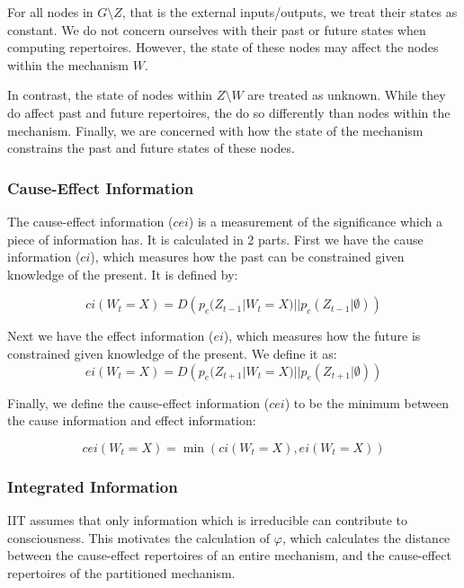 For all nodes in $G\setminus Z$, that is the external inputs/outputs, we treat their states as constant. We do not concern ourselves with their past or future states when computing repertoires. However, the state of these nodes may affect the nodes within the mechanism $W$.

In contrast, the state of nodes within $Z \setminus W$ are treated as unknown. While they do affect past and future repertoires, the do so differently than nodes within the mechanism. Finally, we are concerned with how the state of the mechanism constrains the past and future states of these nodes.

\subsubsection{Cause-Effect Information}
The cause-effect information ($cei$) is a measurement of the significance which a piece of information has. It is calculated in 2 parts. First we have the cause information ($ci$), which measures how the past can be constrained given knowledge of the present. It is defined by:

\begin{equation}
\label{def:ci}
ci(W_{t} = X) = D\left(p_c(Z_{t-1}|W_{t} = X)||p_c(Z_{t-1}|\emptyset)\right)
\end{equation}


Next we have the effect information ($ei$), which measures how the future is constrained given knowledge of the present. We define it as:
\begin{equation}
\label{def:ei}
ei(W_{t} = X) = D\left(p_e(Z_{t+1}|W_{t} = X)||p_{e}(Z_{t+1}|\emptyset)\right)
\end{equation}

Finally, we define the cause-effect information ($cei$) to be the minimum between the cause information and effect information:

\begin{equation}
\label{def:cei}
cei(W_{t} = X) = \min\left(ci(W_{t} = X), ei(W_{t} = X) \right)
\end{equation}

\subsubsection{Integrated Information}
\label{sec:mech_integration}
IIT assumes that only information which is irreducible can contribute to consciousness. This motivates the calculation of $\varphi$, which calculates the distance between the cause-effect repertoires of an entire mechanism, and the cause-effect repertoires of the partitioned mechanism. 

